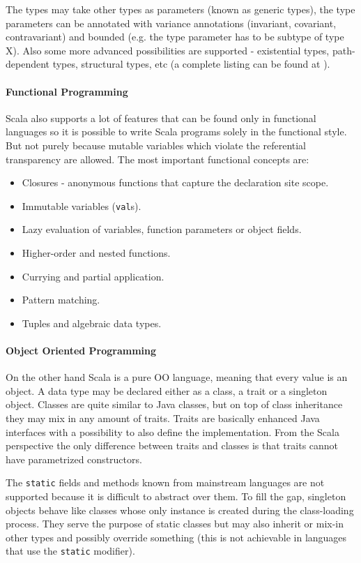 \documentclass[12pt,a4paper]{report}
\begin{document}
The types may take other types as parameters (known as generic types), the type parameters can be annotated with variance annotations (invariant, covariant, contravariant) and bounded (e.g. the type parameter has to be subtype of type X). Also some more advanced possibilities are supported - existential types, path-dependent types, structural types, etc (a complete listing can be found at \cite{ScalaAdvancedTypes}).

\paragraph{Functional Programming} Scala also supports a lot of features that can be found only in functional languages so it is possible to write Scala programs solely in the functional style. But not purely because mutable variables which violate the referential transparency are allowed. The most important functional concepts are:

\begin{itemize}
\item Closures - anonymous functions that capture the declaration site scope.
\item Immutable variables (\texttt{val}s).
\item Lazy evaluation of variables, function parameters or object fields.
\item Higher-order and nested functions.
\item Currying and partial application.
\item Pattern matching.
\item Tuples and algebraic data types.
\end{itemize}

\paragraph{Object Oriented Programming} On the other hand Scala is a pure OO language, meaning that every value is an object. A data type may be declared either as a class, a trait or a singleton object. Classes are quite similar to Java classes, but on top of class inheritance they may mix in any amount of traits. Traits are basically enhanced Java interfaces with a possibility to also define the implementation. From the Scala perspective the only difference between traits and classes is that traits cannot have parametrized constructors.

The \texttt{static} fields and methods known from mainstream languages are not supported because it is difficult to abstract over them. To fill the gap, singleton objects behave like classes whose only instance is created during the class-loading process. They serve the purpose of static classes but may also inherit or mix-in other types and possibly override something (this is not achievable in languages that use the \texttt{static} modifier).
\end{document}
